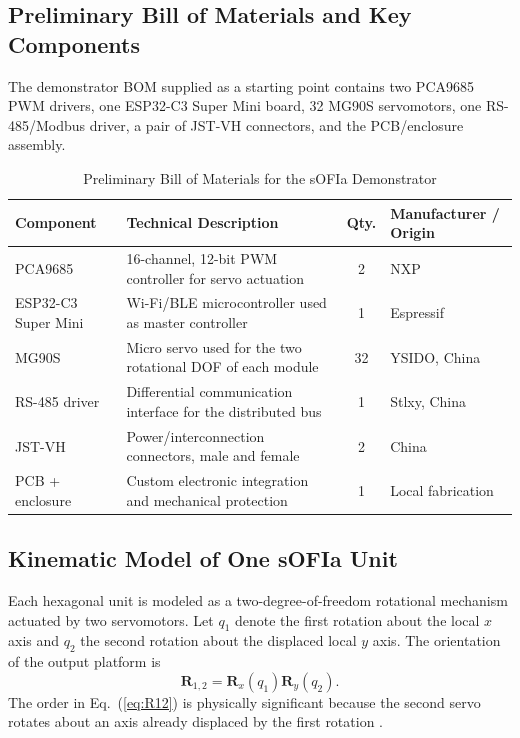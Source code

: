 \documentclass[lettersize,journal]{IEEEtran}
\begin{document}
\subsection{Preliminary Bill of Materials and Key Components}
\label{sec:bom}

The demonstrator BOM supplied as a starting point contains two PCA9685 PWM drivers, one ESP32-C3 Super Mini board, 32 MG90S servomotors, one RS-485/Modbus driver, a pair of JST-VH connectors, and the PCB/enclosure assembly.

\begin{table}[H]
	\caption{Preliminary Bill of Materials for the sOFIa Demonstrator}
	\label{tab:bom}
	\centering
	\footnotesize
	\setlength{\tabcolsep}{3pt}
	\renewcommand{\arraystretch}{1.15}
	\begin{tabular}{p{} p{} c p{}}
		\hline
		\textbf{Component} & \textbf{Technical Description} & \textbf{Qty.} & \textbf{Manufacturer / Origin} \\
		\hline
		
		PCA9685 &
		16-channel, 12-bit PWM controller for servo actuation &
		2 &
		NXP \\
		
		ESP32-C3 Super Mini &
		Wi-Fi/BLE microcontroller used as master controller &
		1 &
		Espressif \\
		
		MG90S &
		Micro servo used for the two rotational DOF of each module &
		32 &
		YSIDO, China \\
		
		RS-485 driver &
		Differential communication interface for the distributed bus &
		1 &
		Stlxy, China \\
		
		JST-VH &
		Power/interconnection connectors, male and female &
		2 &
		China \\
		
		PCB + enclosure &
		Custom electronic integration and mechanical protection &
		1 &
		Local fabrication \\
		\hline
	\end{tabular}
\end{table}

\subsection{Kinematic Model of One sOFIa Unit}
\label{sec:kinematics}

Each hexagonal unit is modeled as a two-degree-of-freedom rotational mechanism actuated by two servomotors. Let $q_1$ denote the first rotation about the local $x$ axis and $q_2$ the second rotation about the displaced local $y$ axis. The orientation of the output platform is \cite{lizarraga2026kinematics}
\begin{equation}
\mathbf{R}_{1,2}=\mathbf{R}_x(q_1)\mathbf{R}_y(q_2).
\label{eq:R12}
\end{equation}
The order in Eq.~(\ref{eq:R12}) is physically significant because the second servo rotates about an axis already displaced by the first rotation \cite{lizarraga2026kinematics}.
\end{document}
